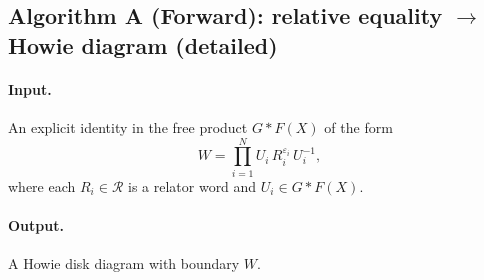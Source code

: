 \documentclass[11pt]{article}
\theoremstyle{definition}
\theoremstyle{plain}
\theoremstyle{remark}
\begin{document}
\subsection*{Algorithm A (Forward): relative equality $\to$ Howie diagram (detailed)}
\paragraph{Input.}
An explicit identity in the free product $G*F(X)$ of the form
\[
W=\prod_{i=1}^N U_i\, R_i^{\varepsilon_i}\,U_i^{-1},
\]
where each $R_i\in \mathcal R$ is a relator word and $U_i\in G*F(X)$.

\paragraph{Output.} A Howie disk diagram with boundary $W$.
\end{document}
